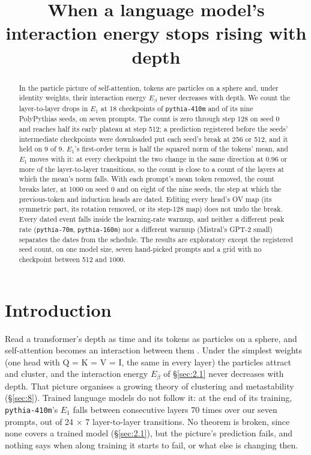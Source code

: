 \documentclass[11pt]{article}
\title{When a language model's interaction energy stops rising with depth}
\author{}
\date{}
\begin{document}
\maketitle

\begin{abstract}
In the particle picture of self-attention, tokens are particles on a sphere and, under identity weights, their interaction energy $E_\beta $ never decreases with depth. We count the layer-to-layer drops in $E_{1}$ at 18 checkpoints of \texttt{pythia-410m} and of its nine PolyPythias seeds, on seven prompts. The count is zero through step 128 on seed 0 and reaches half its early plateau at step 512; a prediction registered before the seeds' intermediate checkpoints were downloaded put each seed's break at 256 or 512, and it held on 9 of 9. $E_{1}$'s first-order term is half the squared norm of the tokens' mean, and $E_{1}$ moves with it: at every checkpoint the two change in the same direction at 0.96 or more of the layer-to-layer transitions, so the count is close to a count of the layers at which the mean's norm falls. With each prompt's mean token removed, the count breaks later, at 1000 on seed 0 and on eight of the nine seeds, the step at which the previous-token and induction heads are dated. Editing every head's OV map (its symmetric part, its rotation removed, or its step-128 map) does not undo the break. Every dated event falls inside the learning-rate warmup, and neither a different peak rate (\texttt{pythia-70m}, \texttt{pythia-160m}) nor a different warmup (Mistral's GPT-2 small) separates the dates from the schedule. The results are exploratory except the registered seed count, on one model size, seven hand-picked prompts and a grid with no checkpoint between 512 and 1000.
\end{abstract}

\section{Introduction}\label{sec:1}

Read a transformer's depth as time and its tokens as particles on a sphere, and self-attention becomes an interaction between them \citep{geshkovski2023}. Under the simplest weights (one head with Q = K = V = I, the same in every layer) the particles attract and cluster, and the interaction energy $E_\beta $ of \S\ref{sec:2.1} never decreases with depth. That picture organises a growing theory of clustering and metastability (\S\ref{sec:8}). Trained language models do not follow it: at the end of its training, \texttt{pythia-410m}'s $E_{1}$ falls between consecutive layers 70 times over our seven prompts, out of 24 $\times $ 7 layer-to-layer transitions. No theorem is broken, since none covers a trained model (\S\ref{sec:2.1}), but the picture's prediction fails, and nothing says when along training it starts to fail, or what else is changing then.
\end{document}
